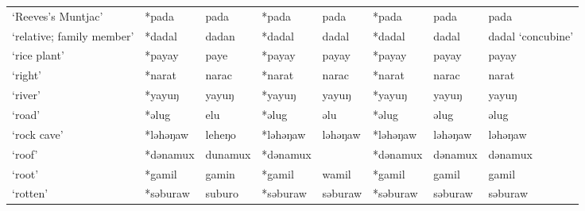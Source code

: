 \begin{landscape}
\begin{longtable}[c]{@{}p{3cm}<{\raggedright}p{2.75cm}<{\raggedright}p{2.75cm}<{\raggedright}p{2.75cm}<{\raggedright}p{2.75cm}<{\raggedright}p{2.75cm}<{\raggedright}p{2.75cm}<{\raggedright}p{2.75cm}<{\raggedright}@{}}
`Reeves's Muntjac'                                   & *pada              & pada                           & *pada              & pada                       & *pada            & pada                     & pada                              \\
`relative; family member'                            & *dadal             & dadan                          & *dadal             & dadal                      & *dadal           & dadal                    & dadal `concubine'                 \\
`rice plant'                                         & *payay             & paye                           & *payay             & payay                      & *payay           & payay                    & payay                             \\
`right'                                              & *narat             & narac                          & *narat             & narac                      & *narat           & narac                    & narat                             \\
`river'                                              & *yayuŋ             & yayuŋ                          & *yayuŋ             & yayuŋ                      & *yayuŋ           & yayuŋ                    & yayuŋ                             \\
`road'                                               & *əlug              & elu                            & *əlug              & əlu                        & *əlug            & əlug                     & əlug                              \\
`rock cave'                                          & *ləhəŋaw           & leheŋo                         & *ləhəŋaw           & ləhəŋaw                    & *ləhəŋaw         & ləhəŋaw                  & ləhəŋaw                           \\
`roof'                                               & *dənamux           & dunamux                        & *dənamux           &                            & *dənamux         & dənamux                  & dənamux                           \\
`root'                                               & *gamil             & gamin                          & *gamil             & wamil                      & *gamil           & gamil                    & gamil                             \\
`rotten'                                             & *səburaw           & suburo                         & *səburaw           & səburaw                    & *səburaw         & səburaw                  & səburaw                           \\

\end{longtable}
\end{landscape}
